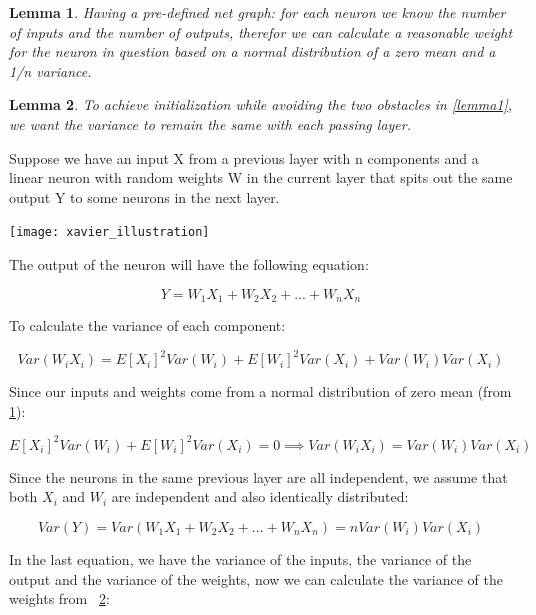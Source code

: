\documentclass[12pt]{article}
\newtheorem{lemma}{Lemma}
\begin{document}
\begin{lemma}\label{lemma2}
Having a pre-defined net graph: for each neuron we know the number of inputs and the number of outputs, therefor we can calculate a reasonable weight for the neuron in question based on a normal distribution of a zero mean and a 1/n variance.
\end{lemma}
\begin{lemma}\label{lemma3}
To achieve initialization while avoiding the two obstacles in \cref{lemma1}, we want the variance to remain the same with each passing layer.	
\end{lemma}
\newpage
Suppose we have an input X from a previous layer with n components and a linear neuron with random weights W in the current layer that spits out the same output Y to some neurons in the next layer.
\begin{center}
	\texttt{[image: xavier\_illustration]}
\end{center}
The output of the neuron will have the following equation:
\begin{center}
	\begin{equation}
		Y = W_1X_1 + W_2X_2 + ... + W_n X_n \label{eq:1}
	\end{equation}
\end{center}
To calculate the variance of each component:
\begin{center}
	\begin{equation}
		Var(W_iX_i) = E[X_i]^2 Var(W_i) + E[W_i]^2 Var(X_i) + Var(W_i)Var(X_i) \label{eq:2}
	\end{equation}
\end{center}
Since our inputs and weights come from a normal distribution of zero mean (from \cref{lemma2}):
\begin{center}
	\begin{equation}
		E[X_i]^2 Var(W_i) + E[W_i]^2 Var(X_i) = 0 \implies
		Var(W_iX_i) = Var(W_i)Var(X_i) \label{eq:3}
	\end{equation}
\end{center}
Since the neurons in the same previous layer are all independent, we assume that both $ X_i $ and $ W_i $  are independent and also identically distributed:
\begin{center}
	\begin{equation}
	 Var(Y) = Var(W_1X_1 + W_2X_2 + ... + W_n X_n) = nVar(W_i)Var(X_i) \label{eq:4}
	\end{equation}
\end{center}
In the last equation, we have the variance of the inputs, the variance of the output and the variance of the weights, now we can calculate the variance of the weights from ~\cref{lemma3}:
\end{document}
